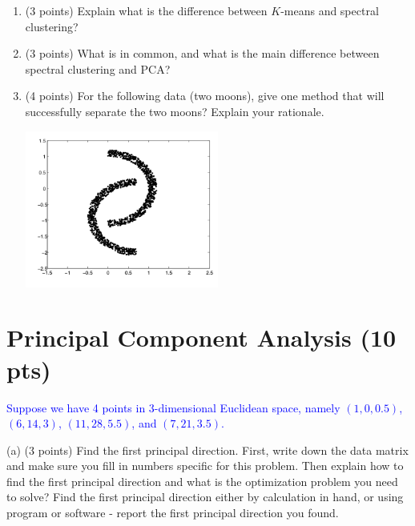 \documentclass[a4paper,12pt,fleqn]{article}
\begin{document}
\begin{enumerate}

\item (3 points) Explain what is the difference between $K$-means and spectral clustering? 

\vspace{1.5in}


\item (3 points) What is in common, and what is the main difference between spectral clustering and PCA?

\vspace{1.5in}

\item (4 points) For the following data (two moons), give one method that will successfully separate the two moons? Explain your rationale. 

\begin{center}
\includegraphics[width = 0.5\textwidth]{./fig/moon}
\end{center}

\end{enumerate}

\vspace{1.5in}
\section{Principal Component Analysis (10 pts)}

\textcolor{blue}{Suppose we have 4 points in 3-dimensional Euclidean space, namely $(1, 0, 0.5)$, $(6, 14, 3)$, $(11, 28, 5.5)$, and $(7, 21, 3.5)$.}

\vspace{.1in}

(a) (3 points) Find the first principal direction. First, write down the data matrix and make sure you fill in numbers specific for this problem. Then explain how to find the first principal direction and what is the optimization problem you need to solve? Find the first principal direction either by calculation in hand, or using program or software - report  the first principal direction you found.
\end{document}
